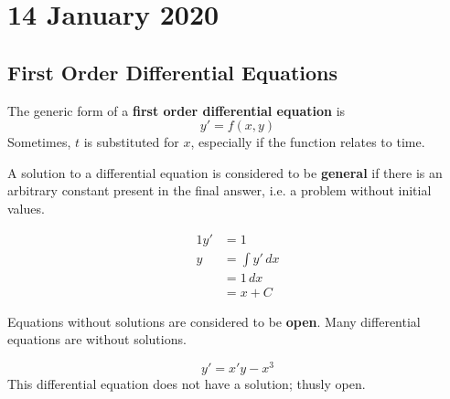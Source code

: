 \documentclass[twoside]{report}
\begin{document}
    \maketitle
    \tableofcontents
    \np

    \chapter{14 January 2020}
    \section{First Order Differential Equations}
    \begin{definition}
        The generic form of a \textbf{first order differential equation} is \begin{equation}
            y' = f(x, y)
        \end{equation}
        Sometimes, $t$ is substituted for $x$, especially if the function relates to time.
    \end{definition}
    \begin{definition}
        A solution to a differential equation is considered to be \textbf{general} if there is an arbitrary constant present in the final answer, i.e. a problem without initial values.
    \end{definition}
    \begin{example}
        \begin{alignat}{1}
            y' &= 1\\
            y &= \int y'\,dx\\
            &= 1\,dx\\
            &= x + C
        \end{alignat}
    \end{example}
    \np
    \begin{definition}
        Equations without solutions are considered to be \textbf{open}. Many differential equations are without solutions.
    \end{definition}
    \begin{example}
        \begin{equation}
            y' = x'y - x^{3}
        \end{equation}
        This differential equation does not have a solution; thusly open.
    \end{example}
\end{document}
